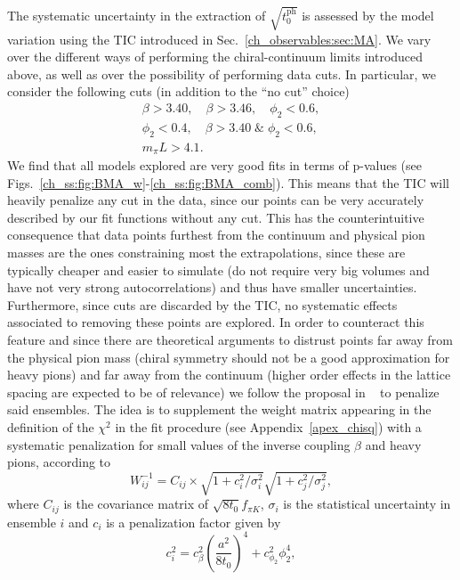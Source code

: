The systematic uncertainty in the extraction of $\sqrt{t_0^{\textrm{ph}}}$ is assessed by the model variation using the TIC introduced in Sec.~\ref{ch_observables:sec:MA}. We vary over the different ways of performing the chiral-continuum limits introduced above, as well as over the possibility of performing data cuts. In particular, we consider the following cuts (in addition to the ``no cut'' choice)
\begin{gather}
\beta>3.40, \quad
\beta>3.46, \quad
\phi_2<0.6, \\
\phi_2<0.4, \quad
\beta>3.40\;\&\;\phi_2<0.6, \\
m_{\pi}L>4.1.
\end{gather}
We find that all models explored are very good fits in terms of p-values (see Figs.~\ref{ch_ss:fig:BMA_w}-\ref{ch_ss:fig:BMA_comb}). This means that the TIC will heavily penalize any cut in the data, since our points can be very accurately described by our fit functions without any cut. This has the counterintuitive consequence that data points furthest from the continuum and physical pion masses are the ones constraining most the extrapolations, since these are typically cheaper and easier to simulate (do not require very big volumes and have not very strong autocorrelations) and thus have smaller uncertainties. Furthermore, since cuts are discarded by the TIC, no systematic effects associated to removing these points are explored. In order to counteract this feature and since there are theoretical arguments to distrust points far away from the physical pion mass (chiral symmetry should not be a good approximation for heavy pions) and far away from the continuum (higher order effects in the lattice spacing are expected to be of relevance) we follow the proposal in ~\citep{DallaBrida:2016kgh} to penalize said ensembles. The idea is to supplement the weight matrix appearing in the definition of the $\chi^2$ in the fit procedure (see Appendix~\ref{apex_chisq}) with a systematic penalization for small values of the inverse coupling $\beta$ and heavy pions, according to 
\begin{equation}
W_{ij}^{-1}=C_{ij}\times\sqrt{1+c_i^2/\sigma_i^2}\sqrt{1+c_j^2/\sigma_j^2},
\end{equation}
where $C_{ij}$ is the covariance matrix of $\sqrt{8t_0}f_{\pi K}$, $\sigma_i$ is the statistical uncertainty in ensemble $i$ and $c_i$ is a penalization factor given by
\begin{equation}
\label{ch_ss:eq:penal}
c_i^2=c_{\beta}^2\left(\frac{a^2}{8t_0}\right)^4+c_{\phi_2}^2\phi_2^4,
\end{equation}
